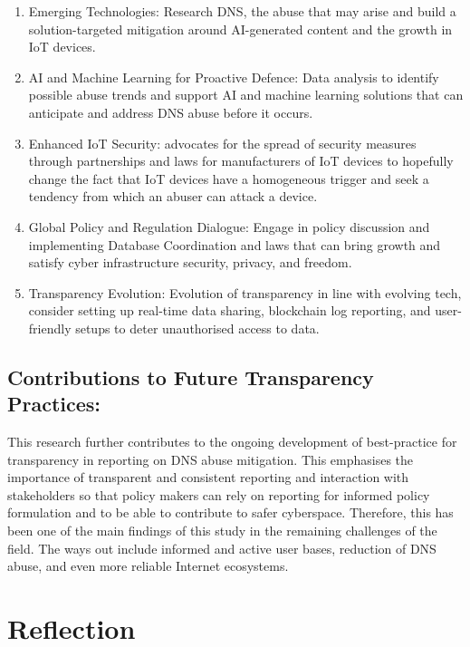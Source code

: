 \begin{enumerate}
    \item Emerging Technologies: Research DNS, the abuse that may arise and build a solution-targeted mitigation around AI-generated content and the growth in IoT devices.

    \item AI and Machine Learning for Proactive Defence: Data analysis to identify possible abuse trends and support AI and machine learning solutions that can anticipate and address DNS abuse before it occurs.

    \item Enhanced IoT Security: advocates for the spread of security measures through partnerships and laws for manufacturers of IoT devices to hopefully change the fact that IoT devices have a homogeneous trigger and seek a tendency from which an abuser can attack a device.

    \item Global Policy and Regulation Dialogue: Engage in policy discussion and implementing Database Coordination and laws that can bring growth and satisfy cyber infrastructure security, privacy, and freedom.

    \item Transparency Evolution: Evolution of transparency in line with evolving tech, consider setting up real-time data sharing, blockchain log reporting, and user-friendly setups to deter unauthorised access to data.

    
\end{enumerate}


\subsection{Contributions to Future Transparency Practices:}

This research further contributes to the ongoing development of best-practice for transparency in reporting on DNS abuse mitigation. This emphasises the importance of transparent and consistent reporting and interaction with stakeholders so that policy makers can rely on reporting for informed policy formulation and to be able to contribute to safer cyberspace. Therefore, this has been one of the main findings of this study in the remaining challenges of the field. The ways out include informed and active user bases, reduction of DNS abuse, and even more reliable Internet ecosystems.


\section{Reflection}
